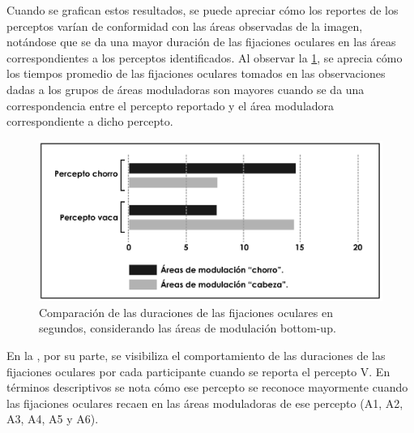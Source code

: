 \documentclass[spanish]{textolivre}
\begin{document}
Cuando se grafican estos resultados, se puede apreciar cómo los reportes de los perceptos varían de conformidad con las áreas observadas de la imagen, notándose que se da una mayor duración de las fijaciones oculares en las áreas correspondientes a los perceptos identificados. Al observar la \cref{fig6}, se aprecia cómo los tiempos promedio de las fijaciones oculares tomados en las observaciones dadas a los grupos de áreas moduladoras son mayores cuando se da una correspondencia entre el percepto reportado y el área moduladora correspondiente a dicho percepto.

\begin{figure}[htbp]
\centering
\begin{minipage}{.75\textwidth}
    \centering
    \includegraphics[width=\linewidth]{Fig6.jpeg}
    \caption{Comparación de las duraciones de las fijaciones oculares en segundos, considerando las áreas de modulación bottom-up.}
    \label{fig6}
\end{minipage}
\end{figure}

En la , por su parte, se visibiliza el comportamiento de las duraciones de las fijaciones oculares por cada participante cuando se reporta el percepto V. En términos descriptivos se nota cómo ese percepto se reconoce mayormente cuando las fijaciones oculares recaen en las áreas moduladoras de ese percepto (A1, A2, A3, A4, A5 y A6).
\end{document}
